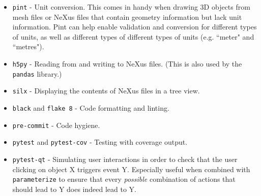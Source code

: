 \begin{itemize}
\item \texttt{pint} - Unit conversion. This comes in handy when drawing 3D objects from mesh files or NeXus files that contain geometry information but lack unit information. Pint can help enable validation and conversion for different types of units, as well as different types of different types of units (e.g. ``meter" and ``metres").
\item \texttt{h5py} - Reading from and writing to NeXus files. (This is also used by the \texttt{pandas} library.)
\item \texttt{silx} - Displaying the contents of NeXus files in a tree view.
\end{itemize}
\begin{itemize}
\item \texttt{black} and \texttt{flake 8} - Code formatting and linting.
\item \texttt{pre-commit} - Code hygiene.
\item \texttt{pytest} and \texttt{pytest-cov} - Testing with coverage output.
\item \texttt{pytest-qt} - Simulating user interactions in order to check that the user clicking on object X triggers event Y. Especially useful when combined with \texttt{parameterize} to ensure that every \textit{possible} combination of actions that should lead to Y does indeed lead to Y.
\end{itemize}
